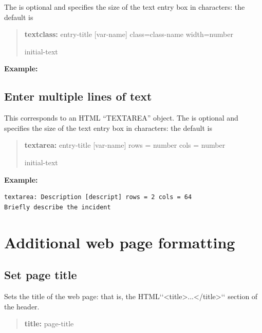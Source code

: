 \documentclass[letterpaper,10pt,english]{sphinxmanual}
\begin{document}
The  is optional and specifies the size of the text
entry box in characters: the default is 
\begin{quote}

\begin{DUlineblock}{0em}
\item[] \textbf{textclass:} entry-title {[}var-name{]} class=class-name
width=number
\item[] initial-text
\end{DUlineblock}
\end{quote}

\textbf{Example:}
\begin{quote}

\end{quote}


\subsection{Enter multiple lines of text}
\label{forms:enter-multiple-lines-of-text}
This corresponds to an HTML “TEXTAREA” object. The
 is optional and specifies the size of
the text entry box in characters: the default is 
\begin{quote}

\begin{DUlineblock}{0em}
\item[] \textbf{textarea:} entry-title {[}var-name{]} rows = number cols = number
\item[] initial-text
\end{DUlineblock}
\end{quote}

\textbf{Example:}

\begin{Verbatim}[commandchars=\\\{\}]
textarea: Description [descript] rows = 2 cols = 64
Briefly describe the incident
\end{Verbatim}


\section{Additional web page formatting}
\label{forms:additional-web-page-formatting}

\subsection{Set page title}
\label{forms:set-page-title}
Sets the title of the web page: that is, the HTML{}`{}`\textless{}title\textgreater{}...\textless{}/title\textgreater{}{}`{}`
section of the header.
\begin{quote}

\begin{DUlineblock}{0em}
\item[] \textbf{title:} page-title
\end{DUlineblock}
\end{quote}
\end{document}
